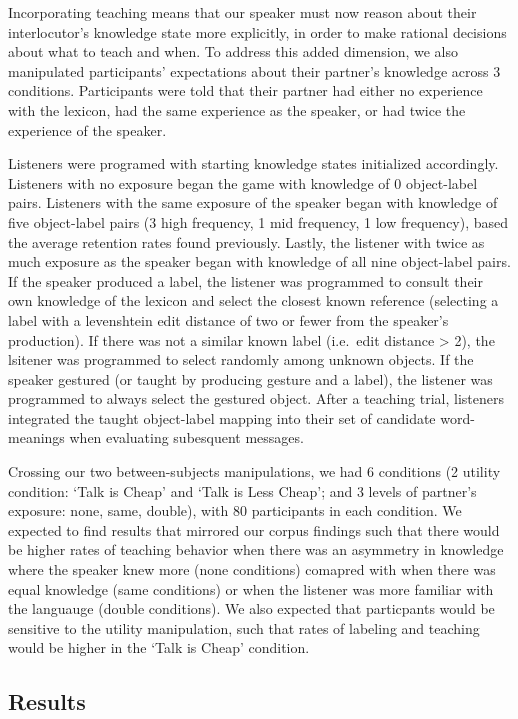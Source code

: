 \documentclass[10pt, letterpaper]{article}
\begin{document}
Incorporating teaching means that our speaker must now reason about
their interlocutor's knowledge state more explicitly, in order to make
rational decisions about what to teach and when. To address this added
dimension, we also manipulated participants' expectations about their
partner's knowledge across 3 conditions. Participants were told that
their partner had either no experience with the lexicon, had the same
experience as the speaker, or had twice the experience of the speaker.

Listeners were programed with starting knowledge states initialized
accordingly. Listeners with no exposure began the game with knowledge of
0 object-label pairs. Listeners with the same exposure of the speaker
began with knowledge of five object-label pairs (3 high frequency, 1 mid
frequency, 1 low frequency), based the average retention rates found
previously. Lastly, the listener with twice as much exposure as the
speaker began with knowledge of all nine object-label pairs. If the
speaker produced a label, the listener was programmed to consult their
own knowledge of the lexicon and select the closest known reference
(selecting a label with a levenshtein edit distance of two or fewer from
the speaker's production). If there was not a similar known label
(i.e.~edit distance \textgreater{} 2), the lsitener was programmed to
select randomly among unknown objects. If the speaker gestured (or
taught by producing gesture and a label), the listener was programmed to
always select the gestured object. After a teaching trial, listeners
integrated the taught object-label mapping into their set of candidate
word-meanings when evaluating subesquent messages.

Crossing our two between-subjects manipulations, we had 6 conditions (2
utility condition: `Talk is Cheap' and `Talk is Less Cheap'; and 3
levels of partner's exposure: none, same, double), with 80 participants
in each condition. We expected to find results that mirrored our corpus
findings such that there would be higher rates of teaching behavior when
there was an asymmetry in knowledge where the speaker knew more (none
conditions) comapred with when there was equal knowledge (same
conditions) or when the listener was more familiar with the languauge
(double conditions). We also expected that particpants would be
sensitive to the utility manipulation, such that rates of labeling and
teaching would be higher in the `Talk is Cheap' condition.

\hypertarget{results-1}{%
\subsection{Results}\label{results-1}}
\end{document}

